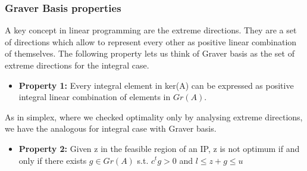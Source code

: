 \documentclass{beamer}
\begin{document}
    \begin{frame}
        \frametitle{Graver Basis properties}
        A key concept in linear programming are the extreme directions. They are a set of directions which allow to represent every other as positive linear combination of themselves. The following property lets us think of Graver basis as the set of extreme directions for the integral case.
        \vspace{0.5cm}
        
        \begin{itemize}
            \item \textbf{Property 1:} Every integral element in ker(A) can be expressed as positive integral linear combination of elements in $Gr(A)$.
            \vspace{0.2cm}
        \end{itemize}
        
        \pause
        \vspace{0.5cm}
        As in simplex, where we checked optimality only by analysing extreme directions, we have the analogous for integral case with Graver basis.
        \vspace{0.5cm}
        
        \begin{itemize}
            \item \textbf{Property 2:} Given z in the feasible region of an IP, z is not optimum if and only if there exists $g \in Gr(A)$ s.t. $c^tg > 0$ and $l \leq z + g \leq u$
        \end{itemize}
        
    \end{frame}
    
\end{document}
